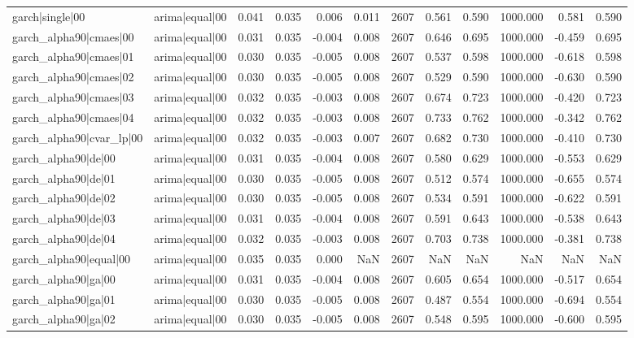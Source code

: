 \begin{table}
\begin{tabular}{llrrrrrrrrrr}
garch|single|00 & arima|equal|00 & 0.041 & 0.035 & 0.006 & 0.011 & 2607 & 0.561 & 0.590 & 1000.000 & 0.581 & 0.590 \\
garch\_alpha90|cmaes|00 & arima|equal|00 & 0.031 & 0.035 & -0.004 & 0.008 & 2607 & 0.646 & 0.695 & 1000.000 & -0.459 & 0.695 \\
garch\_alpha90|cmaes|01 & arima|equal|00 & 0.030 & 0.035 & -0.005 & 0.008 & 2607 & 0.537 & 0.598 & 1000.000 & -0.618 & 0.598 \\
garch\_alpha90|cmaes|02 & arima|equal|00 & 0.030 & 0.035 & -0.005 & 0.008 & 2607 & 0.529 & 0.590 & 1000.000 & -0.630 & 0.590 \\
garch\_alpha90|cmaes|03 & arima|equal|00 & 0.032 & 0.035 & -0.003 & 0.008 & 2607 & 0.674 & 0.723 & 1000.000 & -0.420 & 0.723 \\
garch\_alpha90|cmaes|04 & arima|equal|00 & 0.032 & 0.035 & -0.003 & 0.008 & 2607 & 0.733 & 0.762 & 1000.000 & -0.342 & 0.762 \\
garch\_alpha90|cvar\_lp|00 & arima|equal|00 & 0.032 & 0.035 & -0.003 & 0.007 & 2607 & 0.682 & 0.730 & 1000.000 & -0.410 & 0.730 \\
garch\_alpha90|de|00 & arima|equal|00 & 0.031 & 0.035 & -0.004 & 0.008 & 2607 & 0.580 & 0.629 & 1000.000 & -0.553 & 0.629 \\
garch\_alpha90|de|01 & arima|equal|00 & 0.030 & 0.035 & -0.005 & 0.008 & 2607 & 0.512 & 0.574 & 1000.000 & -0.655 & 0.574 \\
garch\_alpha90|de|02 & arima|equal|00 & 0.030 & 0.035 & -0.005 & 0.008 & 2607 & 0.534 & 0.591 & 1000.000 & -0.622 & 0.591 \\
garch\_alpha90|de|03 & arima|equal|00 & 0.031 & 0.035 & -0.004 & 0.008 & 2607 & 0.591 & 0.643 & 1000.000 & -0.538 & 0.643 \\
garch\_alpha90|de|04 & arima|equal|00 & 0.032 & 0.035 & -0.003 & 0.008 & 2607 & 0.703 & 0.738 & 1000.000 & -0.381 & 0.738 \\
garch\_alpha90|equal|00 & arima|equal|00 & 0.035 & 0.035 & 0.000 & NaN & 2607 & NaN & NaN & NaN & NaN & NaN \\
garch\_alpha90|ga|00 & arima|equal|00 & 0.031 & 0.035 & -0.004 & 0.008 & 2607 & 0.605 & 0.654 & 1000.000 & -0.517 & 0.654 \\
garch\_alpha90|ga|01 & arima|equal|00 & 0.030 & 0.035 & -0.005 & 0.008 & 2607 & 0.487 & 0.554 & 1000.000 & -0.694 & 0.554 \\
garch\_alpha90|ga|02 & arima|equal|00 & 0.030 & 0.035 & -0.005 & 0.008 & 2607 & 0.548 & 0.595 & 1000.000 & -0.600 & 0.595 \\

\end{tabular}
\end{table}
